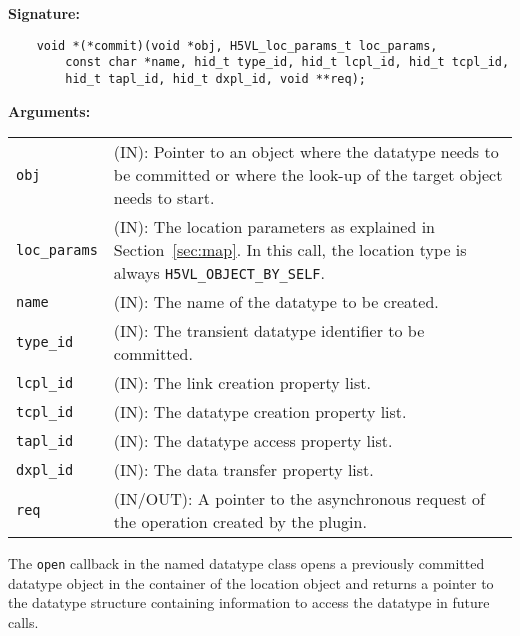 \begin{mdframed}[style=bgbox]
\textbf{Signature:}
\begin{lstlisting}
    void *(*commit)(void *obj, H5VL_loc_params_t loc_params, 
        const char *name, hid_t type_id, hid_t lcpl_id, hid_t tcpl_id, 
        hid_t tapl_id, hid_t dxpl_id, void **req);
\end{lstlisting}

\textbf{Arguments:}\\
\begin{tabular}{l p{13.5cm}}
  \texttt{obj} & (IN): Pointer to an object where the datatype needs
  to be committed or where the look-up of the target object needs to
  start.\\
  \texttt{loc\_params} & (IN): The location parameters as explained in
  Section~\ref{sec:map}. In this call, the location type is always \texttt{H5VL\_OBJECT\_BY\_SELF}. \\
  \texttt{name} & (IN): The name of the datatype to be created.\\
  \texttt{type\_id} & (IN): The transient datatype identifier to be
  committed. \\
  \texttt{lcpl\_id} & (IN): The link creation property list. \\
  \texttt{tcpl\_id} & (IN): The datatype creation property list.\\
  \texttt{tapl\_id} & (IN): The datatype access property list.\\
  \texttt{dxpl\_id} & (IN): The data transfer property list.\\
  \texttt{req} & (IN/OUT): A pointer to the asynchronous request of the
  operation created by the plugin.\\
\end{tabular}
\end{mdframed}

The \texttt{open} callback in the named datatype class opens a
previously committed datatype object in the container of the location
object and returns a pointer to the datatype structure containing
information to access the datatype in future calls.\bigskip

